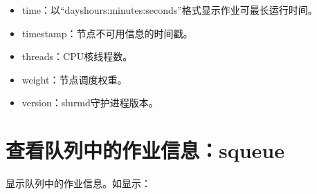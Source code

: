 \documentclass[a4paper,12pt,english]{sphinxmanual}
\begin{document}
\begin{itemize}
\begin{itemize}
\begin{itemize}
\item {} 
\sphinxAtStartPar
time：以“days\sphinxhyphen{}hours:minutes:seconds”格式显示作业可最长运行时间。

\item {} 
\sphinxAtStartPar
timestamp：节点不可用信息的时间戳。

\item {} 
\sphinxAtStartPar
threads：CPU核线程数。

\item {} 
\sphinxAtStartPar
weight：节点调度权重。

\item {} 
\sphinxAtStartPar
version：slurmd守护进程版本。

\end{itemize}

\end{itemize}

\end{itemize}


\section{查看队列中的作业信息：squeue}
\label{\detokenize{slurm/slurm:squeue}}
\sphinxAtStartPar
显示队列中的作业信息。如显示：

\begin{sphinxVerbatim}[commandchars=\\\{\}]
                       
                              \PYG{p}{[}\PYG{p}{]}
                          
\end{sphinxVerbatim}
\end{document}
